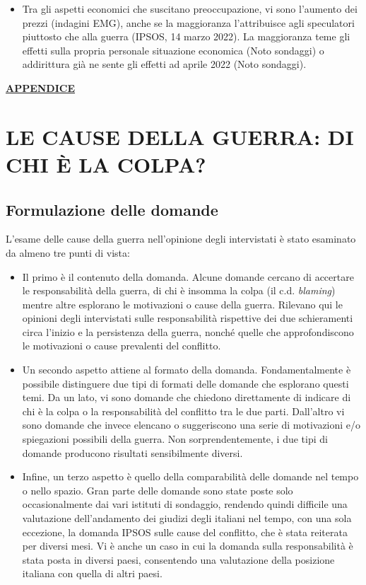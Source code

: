 \documentclass[
  openany]{book}
\providecommand{\tightlist}{%
  \setlength{\itemsep}{0pt}\setlength{\parskip}{0pt}}
\begin{document}
\begin{itemize}
\tightlist
\item
  Tra gli aspetti economici che suscitano preoccupazione, vi sono l'aumento dei prezzi (indagini EMG), anche se la maggioranza l'attribuisce agli speculatori piuttosto che alla guerra (IPSOS, 14 marzo 2022). La maggioranza teme gli effetti sulla propria personale situazione economica (Noto sondaggi) o addirittura già ne sente gli effetti ad aprile 2022 (Noto sondaggi).
\end{itemize}

\href{https://github.com/LucianaFazio/Ucrania/blob/main/PDF_Appendice/II\%20Preoccupazioni\%20Ucraina\%20v.6.pdf}{\textbf{APPENDICE}}

\hypertarget{le-cause-della-guerra-di-chi-uxe8-la-colpa}{%
\chapter{LE CAUSE DELLA GUERRA: DI CHI È LA COLPA?}\label{le-cause-della-guerra-di-chi-uxe8-la-colpa}}

\hypertarget{formulazione-delle-domande-1}{%
\section{Formulazione delle domande}\label{formulazione-delle-domande-1}}

L'esame delle cause della guerra nell'opinione degli intervistati è stato esaminato da almeno tre punti di vista:

\begin{itemize}
\item
  Il primo è il contenuto della domanda. Alcune domande cercano di accertare le responsabilità della guerra, di chi è insomma la colpa (il c.d. \emph{blaming}) mentre altre esplorano le motivazioni o cause della guerra. Rilevano qui le opinioni degli intervistati sulle responsabilità rispettive dei due schieramenti circa l'inizio e la persistenza della guerra, nonché quelle che approfondiscono le motivazioni o cause prevalenti del conflitto.
\item
  Un secondo aspetto attiene al formato della domanda. Fondamentalmente è possibile distinguere due tipi di formati delle domande che esplorano questi temi. Da un lato, vi sono domande che chiedono direttamente di indicare di chi è la colpa o la responsabilità del conflitto tra le due parti. Dall'altro vi sono domande che invece elencano o suggeriscono una serie di motivazioni e/o spiegazioni possibili della guerra. Non sorprendentemente, i due tipi di domande producono risultati sensibilmente diversi.
\item
  Infine, un terzo aspetto è quello della comparabilità delle domande nel tempo o nello spazio. Gran parte delle domande sono state poste solo occasionalmente dai vari istituti di sondaggio, rendendo quindi difficile una valutazione dell'andamento dei giudizi degli italiani nel tempo, con una sola eccezione, la domanda IPSOS sulle cause del conflitto, che è stata reiterata per diversi mesi. Vi è anche un caso in cui la domanda sulla responsabilità è stata posta in diversi paesi, consentendo una valutazione della posizione italiana con quella di altri paesi.
\end{itemize}
\end{document}
